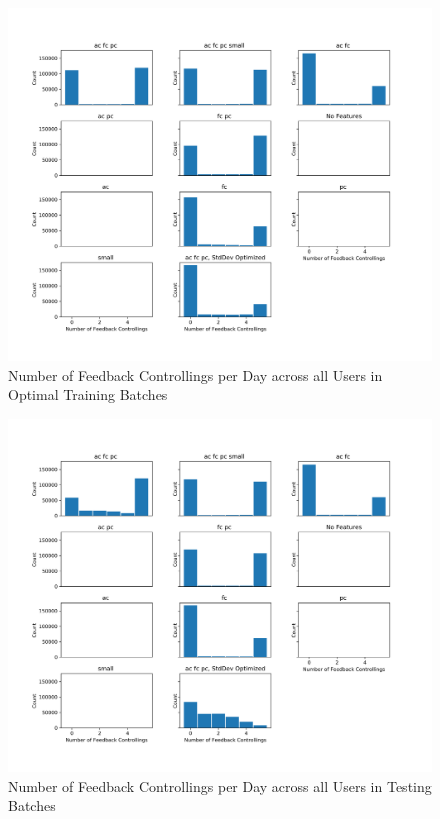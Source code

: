 	\begin{figure}[H]
	\includegraphics[width=1.5\textwidth,center]{figures/QM8train.png}%
	\caption{Number of Feedback Controllings per Day across all Users in Optimal Training Batches}
	\label{QM8train}
	\end{figure}

	\begin{figure}[H]
	\includegraphics[width=1.5\textwidth,center]{figures/QM8test.png}%
	\caption{Number of Feedback Controllings per Day across all Users in Testing Batches}
	\label{QM8test}
	\end{figure}

